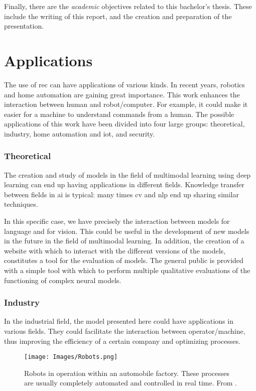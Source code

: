 Finally, there are the \emph{academic} objectives related to this bachelor's
thesis. These include the writing of this report, and the creation and
preparation of the presentation.


\section{Applications}\label{sec:applications}

The use of \gls{rec} can have applications of various kinds. In recent years,
robotics and home automation are gaining great importance. This work enhances
the interaction between human and robot/computer. For example, it could make it
easier for a machine to understand commands from a human. The possible
applications of this work have been divided into four large groups:
theoretical, industry, home automation and \acs{iot}, and security.

\subsubsection{Theoretical}

The creation and study of models in the field of multimodal
learning using deep learning can end up having
applications in different fields. Knowledge transfer between fields in \gls{ai}
is typical: many times \gls{cv} and \gls{nlp} end up sharing similar
techniques.

In this specific case, we have precisely the interaction between models for
language and for vision. This could be useful in the development of new models
in the future in the field of multimodal
learning. In addition, the creation of a website
with which to interact with the different versions of the models, constitutes a
tool for the evaluation of models. The general public is provided with a simple
tool with which to perform multiple qualitative evaluations of the functioning
of complex neural models.

\subsubsection{Industry}

In the industrial field, the model presented here could have applications in
various fields. They could facilitate the interaction between operator/machine,
thus improving the efficiency of a certain company and optimizing processes.

\begin{figure}[ht]
  \centering
  \texttt{[image: Images/Robots.png]}
  \caption[Robots in automobile factory]{Robots in operation within an
    automobile factory. These processes are usually completely automated and
    controlled in real time. From
    .}%
  \label{fig:robots}
\end{figure}

